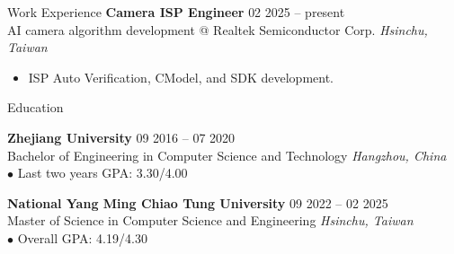 \documentclass{resume}
\begin{document}
\vspace{-1em}
\begin{rSection}{Work Experience}
    {\bf Camera ISP Engineer} \hfill {02 2025 -- present}\\
    {AI camera algorithm development @ Realtek Semiconductor Corp.} \hfill \textit{Hsinchu, Taiwan}\\
    \begin{itemize}
        \item ISP Auto Verification, CModel, and SDK development.
    \end{itemize}
\end{rSection}

\vspace{-1em}
\begin{rSection}{Education}

{\bf Zhejiang University} \hfill {09 2016 -- 07 2020}\\
{Bachelor of Engineering in Computer Science and Technology} \hfill \textit{Hangzhou, China}\\
$\bullet$ Last two years GPA: 3.30/4.00

{\bf National Yang Ming Chiao Tung University} \hfill {09 2022 -- 02 2025}\\
{Master of Science in Computer Science and Engineering} \hfill \textit{Hsinchu, Taiwan}\\
$\bullet$ Overall GPA: 4.19/4.30

\end{rSection}
\end{document}
